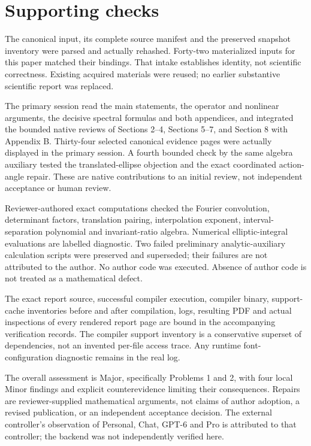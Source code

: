 \documentclass[10pt]{article}
\begin{document}
\section*{Supporting checks}
The canonical input, its complete source manifest and the preserved snapshot inventory were parsed and actually rehashed. Forty-two materialized inputs for this paper matched their bindings. That intake establishes identity, not scientific correctness. Existing acquired materials were reused; no earlier substantive scientific report was replaced.\par
The primary session read the main statements, the operator and nonlinear arguments, the decisive spectral formulas and both appendices, and integrated the bounded native reviews of Sections 2–4, Sections 5–7, and Section 8 with Appendix B. Thirty-four selected canonical evidence pages were actually displayed in the primary session. A fourth bounded check by the same algebra auxiliary tested the translated-ellipse objection and the exact coordinated action-angle repair. These are native contributions to an initial review, not independent acceptance or human review.\par
Reviewer-authored exact computations checked the Fourier convolution, determinant factors, translation pairing, interpolation exponent, interval-separation polynomial and invariant-ratio algebra. Numerical elliptic-integral evaluations are labelled diagnostic. Two failed preliminary analytic-auxiliary calculation scripts were preserved and superseded; their failures are not attributed to the author. No author code was executed. Absence of author code is not treated as a mathematical defect.\par
The exact report source, successful compiler execution, compiler binary, support-cache inventories before and after compilation, logs, resulting PDF and actual inspections of every rendered report page are bound in the accompanying verification records. The compiler support inventory is a conservative superset of dependencies, not an invented per-file access trace. Any runtime font-configuration diagnostic remains in the real log.\par
The overall assessment is Major, specifically Problems 1 and 2, with four local Minor findings and explicit counterevidence limiting their consequences. Repairs are reviewer-supplied mathematical arguments, not claims of author adoption, a revised publication, or an independent acceptance decision. The external controller’s observation of Personal, Chat, GPT-6 and Pro is attributed to that controller; the backend was not independently verified here.\par
\end{document}
